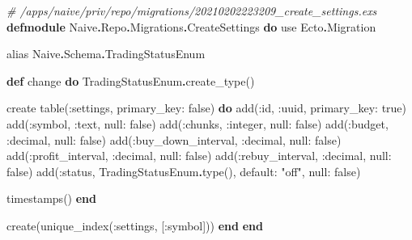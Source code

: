 \documentclass[
]{book}
\newenvironment{Shaded}{\begin{snugshade}}{\end{snugshade}}
\newcommand{\CommentTok}[1]{\textcolor[rgb]{0.56,0.35,0.01}{\textit{#1}}}
\newcommand{\ConstantTok}[1]{\textcolor[rgb]{0.00,0.00,0.00}{#1}}
\newcommand{\ImportTok}[1]{#1}
\newcommand{\KeywordTok}[1]{\textcolor[rgb]{0.13,0.29,0.53}{\textbf{#1}}}
\newcommand{\NormalTok}[1]{#1}
\newcommand{\OperatorTok}[1]{\textcolor[rgb]{0.81,0.36,0.00}{\textbf{#1}}}
\newcommand{\StringTok}[1]{\textcolor[rgb]{0.31,0.60,0.02}{#1}}
\newcommand{\VariableTok}[1]{\textcolor[rgb]{0.00,0.00,0.00}{#1}}
\begin{document}
\begin{Shaded}
\begin{Highlighting}[]
\CommentTok{\# /apps/naive/priv/repo/migrations/20210202223209\_create\_settings.exs}
\KeywordTok{defmodule} \ConstantTok{Naive}\OperatorTok{.}\ConstantTok{Repo}\OperatorTok{.}\ConstantTok{Migrations}\OperatorTok{.}\ConstantTok{CreateSettings} \KeywordTok{do}
  \ImportTok{use} \ConstantTok{Ecto}\OperatorTok{.}\ConstantTok{Migration}

  \ImportTok{alias} \ConstantTok{Naive}\OperatorTok{.}\ConstantTok{Schema}\OperatorTok{.}\ConstantTok{TradingStatusEnum}

  \KeywordTok{def}\NormalTok{ change }\KeywordTok{do}
    \ConstantTok{TradingStatusEnum}\OperatorTok{.}\NormalTok{create\_type()}

\NormalTok{    create table(}\VariableTok{:settings}\NormalTok{, }\VariableTok{primary\_key:} \ConstantTok{false}\NormalTok{) }\KeywordTok{do}
\NormalTok{      add(}\VariableTok{:id}\NormalTok{, }\VariableTok{:uuid}\NormalTok{, }\VariableTok{primary\_key:} \ConstantTok{true}\NormalTok{)}
\NormalTok{      add(}\VariableTok{:symbol}\NormalTok{, }\VariableTok{:text}\NormalTok{, }\VariableTok{null:} \ConstantTok{false}\NormalTok{)}
\NormalTok{      add(}\VariableTok{:chunks}\NormalTok{, }\VariableTok{:integer}\NormalTok{, }\VariableTok{null:} \ConstantTok{false}\NormalTok{)}
\NormalTok{      add(}\VariableTok{:budget}\NormalTok{, }\VariableTok{:decimal}\NormalTok{, }\VariableTok{null:} \ConstantTok{false}\NormalTok{)}
\NormalTok{      add(}\VariableTok{:buy\_down\_interval}\NormalTok{, }\VariableTok{:decimal}\NormalTok{, }\VariableTok{null:} \ConstantTok{false}\NormalTok{)}
\NormalTok{      add(}\VariableTok{:profit\_interval}\NormalTok{, }\VariableTok{:decimal}\NormalTok{, }\VariableTok{null:} \ConstantTok{false}\NormalTok{)}
\NormalTok{      add(}\VariableTok{:rebuy\_interval}\NormalTok{, }\VariableTok{:decimal}\NormalTok{, }\VariableTok{null:} \ConstantTok{false}\NormalTok{)}
\NormalTok{      add(}\VariableTok{:status}\NormalTok{, }\ConstantTok{TradingStatusEnum}\OperatorTok{.}\NormalTok{type(), }\VariableTok{default:} \StringTok{"off"}\NormalTok{, }\VariableTok{null:} \ConstantTok{false}\NormalTok{)}
      
\NormalTok{      timestamps()}
    \KeywordTok{end}

\NormalTok{    create(unique\_index(}\VariableTok{:settings}\NormalTok{, [}\VariableTok{:symbol}\NormalTok{]))}
  \KeywordTok{end}
\KeywordTok{end}
\end{Highlighting}
\end{Shaded}
\end{document}
